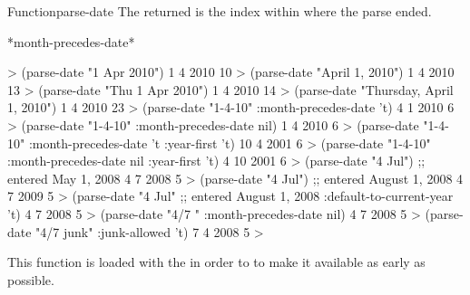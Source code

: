 \documentclass[10pt,twoside,english,pdftex]{article}
\begin{document}
\begin{functiondoc}{Function}{parse-date}
The returned  is the index within  where the
parse ended.

\begin{alsos}{*month-precedes-date*}
\end{alsos}

\fnexamples
%
\W\supp
\begin{example}
  > (parse-date "1 Apr 2010")
  1
  4
  2010
  10
  > (parse-date "April 1, 2010")
  1
  4
  2010
  13
  > (parse-date "Thu 1 Apr 2010")
  1
  4
  2010
  14
  > (parse-date "Thursday, April 1, 2010")
  1
  4
  2010
  23\goodpagebreak
  > (parse-date "1-4-10" :month-precedes-date 't)
  4
  1
  2010
  6
  > (parse-date "1-4-10" :month-precedes-date nil)
  1
  4
  2010
  6\goodpagebreak
  > (parse-date "1-4-10" :month-precedes-date 't :year-first 't)
  10
  4
  2001
  6
  > (parse-date "1-4-10" :month-precedes-date nil :year-first 't)
  4
  10
  2001
  6\goodpagebreak
  > (parse-date "4 Jul") \textcolor{darkergray}{;; entered May 1, 2008}
  4
  7
  2008
  5
  > (parse-date "4 Jul") \textcolor{darkergray}{;; entered August 1, 2008}
  4
  7
  2009
  5
  > (parse-date "4 Jul"  \textcolor{darkergray}{;; entered August 1, 2008}
      :default-to-current-year 't)
  4
  7
  2008
  5
  > (parse-date "4/7  " :month-precedes-date nil)
  4
  7
  2008
  5\goodpagebreak
  > (parse-date "4/7  junk" :junk-allowed 't)
  7
  4
  2008
  5
  >
\end{example}

\fnnote
{}%
%
%
This function is loaded with the  
in order to to make it available as early as possible.
\end{functiondoc}

\end{document}
